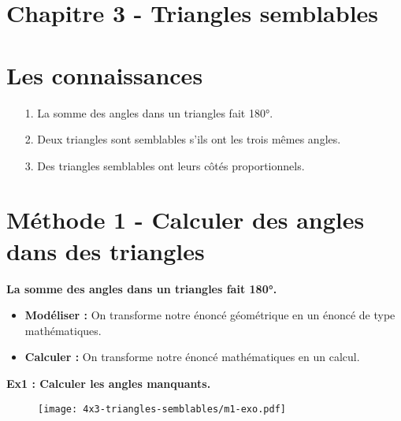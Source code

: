 



\horrule{2px}
\section*{Chapitre 3 - Triangles semblables}
\horrule{2px}

\section*{Les connaissances}

\begin{enumerate}
  \item[1.] La somme des angles dans un triangles fait 180°.
  \item[2.] Deux triangles sont semblables s'ils ont les trois mêmes angles.
  \item[3.] Des triangles semblables ont leurs côtés proportionnels. 
\end{enumerate}

\section*{Méthode 1 - Calculer des angles dans des triangles}

\textbf{La somme des angles dans un triangles fait 180°.} 

\begin{itemize}
  \item \textbf{Modéliser : } On transforme notre énoncé géométrique en un énoncé de type mathématiques.
  \item \textbf{Calculer : } On transforme notre énoncé mathématiques en un calcul. 
\end{itemize}

\horrule{1px}
\textbf{Ex1 : Calculer les angles manquants.}

\begin{figure}[H]
  \centering
  \texttt{[image: 4x3-triangles-semblables/m1-exo.pdf]}
\end{figure}

